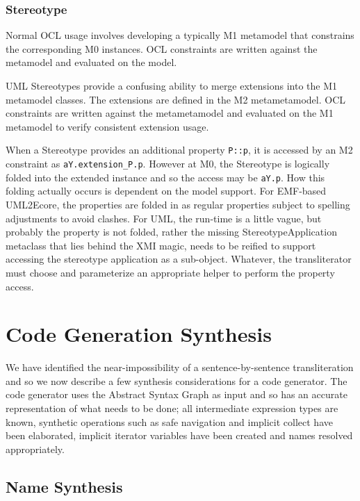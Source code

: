 \documentclass[sigconf]{acmart}
\begin{document}
\subsubsection{Stereotype}

Normal OCL usage involves developing a typically M1 metamodel that constrains the corresponding M0 instances. OCL constraints are written against the metamodel and evaluated on the model.

UML Stereotypes provide a confusing ability to merge extensions into the M1 metamodel classes. The extensions are defined in the M2 metametamodel. OCL constraints are written against the metametamodel and evaluated on the M1 metamodel to verify consistent extension usage.

When a Stereotype provides an additional property \verb|P::p|, it is accessed by an M2 constraint as \verb|aY.extension_P.p|. However at M0, the Stereotype is logically folded into the extended instance and so the access may be \verb|aY.p|. How this folding actually occurs is dependent on the model support. For EMF-based UML2Ecore, the properties are folded in as regular properties subject to spelling adjustments to avoid clashes. For UML, the run-time is a little vague, but probably the property is not folded, rather the missing StereotypeApplication metaclass that lies behind the XMI magic, needs to be reified to support accessing the stereotype application as a sub-object. Whatever, the transliterator must choose and parameterize an appropriate helper to perform the property access.

\section{Code Generation Synthesis}\label{Code Generation Synthesis}

We have identified the near-impossibility of a sentence-by-sentence transliteration and so we now describe a few synthesis considerations for a code generator. The code generator uses the Abstract Syntax Graph as input and so has an accurate representation of what needs to be done; all intermediate expression types are known, synthetic operations such as safe navigation and implicit collect have been elaborated, implicit iterator variables have been created and names resolved appropriately. 

\subsection{Name Synthesis}
\end{document}
